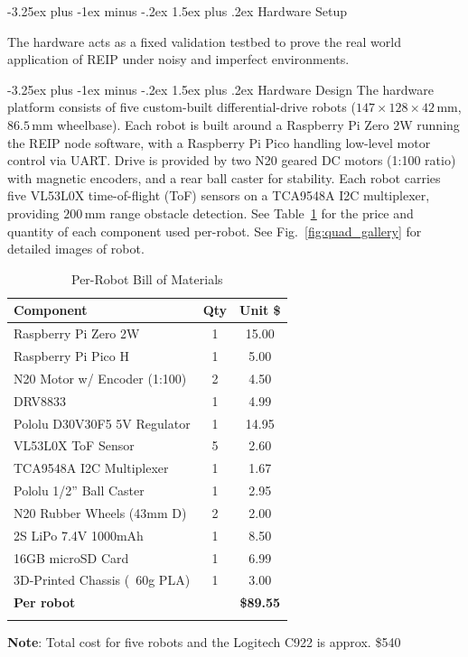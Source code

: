 \documentclass[conference]{IEEEtran}
\makeatletter
\renewcommand{\subsection}{\@startsection{subsection}{2}{\z@}%
  {-3.25ex plus -1ex minus -.2ex}%
  {1.5ex plus .2ex}%
  {\normalfont\normalsize\itshape\centering}}
\makeatother
\begin{document}
\subsection{Hardware Setup}

The hardware acts as a fixed validation testbed to prove the real world application of REIP under noisy and imperfect environments.

\subsection{Hardware Design}
\label{sec:hw_arch}
The hardware platform consists of five custom-built differential-drive robots ($147 \times 128 \times 42\,$mm, $86.5\,$mm wheelbase). Each robot is built around a Raspberry Pi Zero 2W running the REIP node software, with a Raspberry Pi Pico handling low-level motor control via UART. Drive is provided by two N20 geared DC motors (1:100 ratio) with magnetic encoders, and a rear ball caster for stability.  Each robot carries five VL53L0X time-of-flight (ToF) sensors on a TCA9548A I2C multiplexer, providing $200\,$mm range obstacle detection. See Table~\ref{tab:bom} for the price and quantity of each component used per-robot. See Fig.~\ref{fig:quad_gallery} for detailed images of robot.



\begin{table}[t]
\centering
\caption{Per-Robot Bill of Materials}
\label{tab:bom}
\begin{tabular}{lcc}
\hline
\textbf{Component} & \textbf{Qty} & \textbf{Unit \$} \\
\hline
Raspberry Pi Zero 2W          & 1 & 15.00 \\
Raspberry Pi Pico H           & 1 &  5.00 \\
N20 Motor w/ Encoder (1:100)  & 2 &  4.50 \\
DRV8833                       & 1 & 4.99 \\
Pololu D30V30F5 5V Regulator  & 1 & 14.95 \\
VL53L0X ToF Sensor            & 5 &  2.60 \\
TCA9548A I2C Multiplexer      & 1 &  1.67 \\
Pololu 1/2'' Ball Caster      & 1 &  2.95 \\
N20 Rubber Wheels (43mm D)     & 2 &  2.00 \\
2S LiPo 7.4V 1000mAh         & 1 &  8.50 \\
16GB microSD Card             & 1 &  6.99 \\
3D-Printed Chassis (~60g PLA) & 1 &  3.00 \\
\hline
\textbf{Per robot}            &   & \textbf{\$89.55} \\
\hline
\newline

\end{tabular}

\textbf{Note}: Total cost for five robots and the Logitech C922 is approx. \$540
\end{table}
\end{document}
